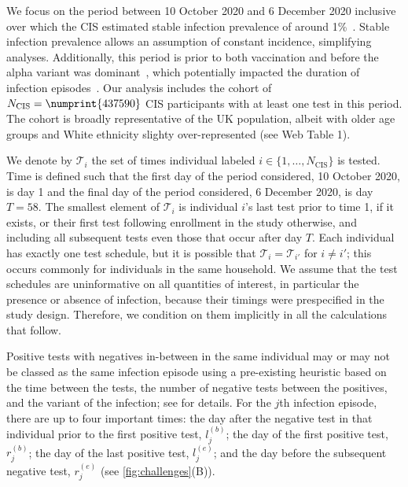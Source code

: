 \documentclass[referee,useAMS,usenatbib]{biom}
\newcommand{\Ncis}{N_\text{CIS}}
\newcommand{\sched}{\mathcal{T}}
\begin{document}
We focus on the period between 10 October 2020 and 6 December 2020 inclusive over which the CIS estimated stable infection prevalence of around 1\%~\citep{onsCISdec2020}.
Stable infection prevalence allows an assumption of constant incidence, simplifying analyses.
Additionally, this period is prior to both vaccination and before the alpha variant was dominant~\citep{lythgoeLineage}, which potentially impacted the duration of infection episodes~\citep{hakkiOnset,russellWithinhost}.
Our analysis includes the cohort of $\Ncis = \numprint{437590}$ CIS participants with at least one test in this period.
The cohort is broadly representative of the UK population, albeit with older age groups and White ethnicity slighty over-represented (see Web Table 1).

We denote by $\sched_i$ the set of times individual labeled $i \in \{ 1, \dots, \Ncis \}$ is tested.
Time is defined such that the first day of the period considered, 10 October 2020, is day 1 and the final day of the period considered, 6 December 2020, is day $T = 58$.
The smallest element of $\sched_i$ is individual $i$'s last test prior to time 1, if it exists, or their first test following enrollment in the study otherwise, and including all subsequent tests even those that occur after day $T$.
Each individual has exactly one test schedule, but it is possible that $\sched_i = \sched_{i'}$ for $i \neq i'$; this occurs commonly for individuals in the same household.
We assume that the test schedules are uninformative on all quantities of interest, in particular the presence or absence of infection, because their timings were prespecified in the study design.
Therefore, we condition on them implicitly in all the calculations that follow.


Positive tests with negatives in-between in the same individual may or may not be classed as the same infection episode using a pre-existing heuristic based on the time between the tests, the number of negative tests between the positives, and the variant of the infection; see \citet{weiRisk} for details.
For the $j$th infection episode, there are up to four important times: the day after the negative test in that individual prior to the first positive test, $l_j^{(b)}$; the day of the first positive test, $r_j^{(b)}$; the day of the last positive test, $l_j^{(e)}$; and the day before the subsequent negative test, $r_j^{(e)}$ (see \cref{fig:challenges}(B)).
\end{document}
